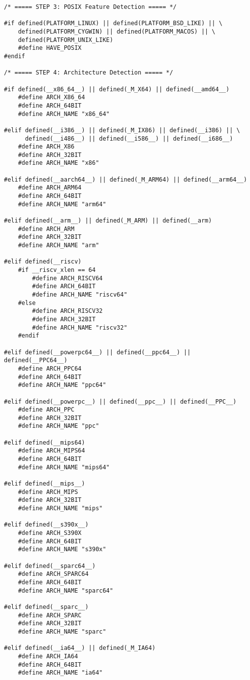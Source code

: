\begin{lstlisting}
/* ===== STEP 3: POSIX Feature Detection ===== */

#if defined(PLATFORM_LINUX) || defined(PLATFORM_BSD_LIKE) || \
    defined(PLATFORM_CYGWIN) || defined(PLATFORM_MACOS) || \
    defined(PLATFORM_UNIX_LIKE)
    #define HAVE_POSIX
#endif

/* ===== STEP 4: Architecture Detection ===== */

#if defined(__x86_64__) || defined(_M_X64) || defined(__amd64__)
    #define ARCH_X86_64
    #define ARCH_64BIT
    #define ARCH_NAME "x86_64"

#elif defined(__i386__) || defined(_M_IX86) || defined(__i386) || \
      defined(__i486__) || defined(__i586__) || defined(__i686__)
    #define ARCH_X86
    #define ARCH_32BIT
    #define ARCH_NAME "x86"

#elif defined(__aarch64__) || defined(_M_ARM64) || defined(__arm64__)
    #define ARCH_ARM64
    #define ARCH_64BIT
    #define ARCH_NAME "arm64"

#elif defined(__arm__) || defined(_M_ARM) || defined(__arm)
    #define ARCH_ARM
    #define ARCH_32BIT
    #define ARCH_NAME "arm"

#elif defined(__riscv)
    #if __riscv_xlen == 64
        #define ARCH_RISCV64
        #define ARCH_64BIT
        #define ARCH_NAME "riscv64"
    #else
        #define ARCH_RISCV32
        #define ARCH_32BIT
        #define ARCH_NAME "riscv32"
    #endif

#elif defined(__powerpc64__) || defined(__ppc64__) || defined(__PPC64__)
    #define ARCH_PPC64
    #define ARCH_64BIT
    #define ARCH_NAME "ppc64"

#elif defined(__powerpc__) || defined(__ppc__) || defined(__PPC__)
    #define ARCH_PPC
    #define ARCH_32BIT
    #define ARCH_NAME "ppc"

#elif defined(__mips64)
    #define ARCH_MIPS64
    #define ARCH_64BIT
    #define ARCH_NAME "mips64"

#elif defined(__mips__)
    #define ARCH_MIPS
    #define ARCH_32BIT
    #define ARCH_NAME "mips"

#elif defined(__s390x__)
    #define ARCH_S390X
    #define ARCH_64BIT
    #define ARCH_NAME "s390x"

#elif defined(__sparc64__)
    #define ARCH_SPARC64
    #define ARCH_64BIT
    #define ARCH_NAME "sparc64"

#elif defined(__sparc__)
    #define ARCH_SPARC
    #define ARCH_32BIT
    #define ARCH_NAME "sparc"

#elif defined(__ia64__) || defined(_M_IA64)
    #define ARCH_IA64
    #define ARCH_64BIT
    #define ARCH_NAME "ia64"


\end{lstlisting}
